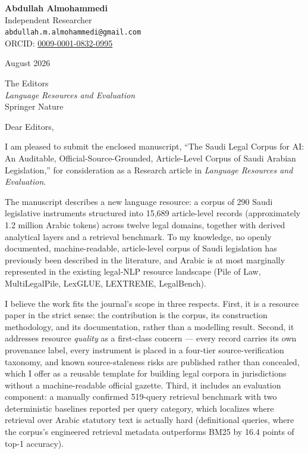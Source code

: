 \documentclass[10.5pt]{letter}
\begin{document}
\noindent
{\large\textbf{Abdullah Almohammedi}}\\
Independent Researcher\\
\texttt{abdullah.m.almohammedi@gmail.com}\\
ORCID: \href{https://orcid.org/0009-0001-0832-0995}{0009-0001-0832-0995}

\vspace{0.8em}
 August 2026

\vspace{0.8em}
\noindent The Editors\\
\emph{Language Resources and Evaluation}\\
Springer Nature

\vspace{0.9em}
\noindent Dear Editors,

\vspace{0.6em}
I am pleased to submit the enclosed manuscript, ``The Saudi Legal Corpus for
AI: An Auditable, Official-Source-Grounded, Article-Level Corpus of Saudi
Arabian Legislation,'' for consideration as a Research article in
\emph{Language Resources and Evaluation}.

\vspace{0.5em}
The manuscript describes a new language resource: a corpus of 290 Saudi
legislative instruments structured into 15,689 article-level records
(approximately 1.2 million Arabic tokens) across twelve legal domains,
together with derived analytical layers and a retrieval benchmark. To my
knowledge, no openly documented, machine-readable, article-level corpus of
Saudi legislation has previously been described in the literature, and Arabic
is at most marginally represented in the existing legal-NLP resource
landscape (Pile of Law, MultiLegalPile, LexGLUE, LEXTREME, LegalBench).

\vspace{0.5em}
I believe the work fits the journal's scope in three respects. First, it is a
resource paper in the strict sense: the contribution is the corpus, its
construction methodology, and its documentation, rather than a modelling
result. Second, it addresses resource \emph{quality} as a first-class
concern --- every record carries its own provenance label, every instrument
is placed in a four-tier source-verification taxonomy, and known
source-staleness risks are published rather than concealed, which I offer as
a reusable template for building legal corpora in jurisdictions without a
machine-readable official gazette. Third, it includes an evaluation
component: a manually confirmed 519-query retrieval benchmark with two
deterministic baselines reported per query category, which localizes where
retrieval over Arabic statutory text is actually hard (definitional queries,
where the corpus's engineered retrieval metadata outperforms BM25 by 16.4
points of top-1 accuracy).
\end{document}
